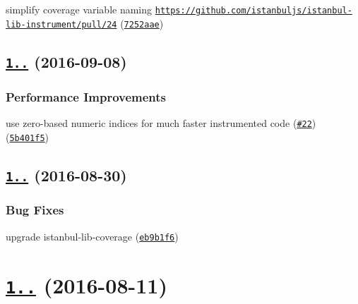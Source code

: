 \begin{DoxyItemize}
\item simplify coverage variable naming \href{https://github.com/istanbuljs/istanbul-lib-instrument/pull/24}{\tt https\+://github.\+com/istanbuljs/istanbul-\/lib-\/instrument/pull/24} (\href{https://github.com/istanbuljs/istanbul-lib-instrument/commit/7252aae}{\tt 7252aae})
\end{DoxyItemize}

\label{_1.1.2}%
 \subsection*{\href{https://github.com/istanbuljs/istanbul-lib-instrument/compare/v1.1.1...v1.1.2}{\tt 1..} (2016-\/09-\/08)}

\subsubsection*{Performance Improvements}


\begin{DoxyItemize}
\item use zero-\/based numeric indices for much faster instrumented code (\href{https://github.com/istanbuljs/istanbul-lib-instrument/issues/22}{\tt \#22}) (\href{https://github.com/istanbuljs/istanbul-lib-instrument/commit/5b401f5}{\tt 5b401f5})
\end{DoxyItemize}

\label{_1.1.1}%
 \subsection*{\href{https://github.com/istanbuljs/istanbul-lib-instrument/compare/v1.1.0...v1.1.1}{\tt 1..} (2016-\/08-\/30)}

\subsubsection*{Bug Fixes}


\begin{DoxyItemize}
\item upgrade istanbul-\/lib-\/coverage (\href{https://github.com/istanbuljs/istanbul-lib-instrument/commit/eb9b1f6}{\tt eb9b1f6})
\end{DoxyItemize}

\label{_1.1.0}%
 \section*{\href{https://github.com/istanbuljs/istanbul-lib-instrument/compare/v1.1.0-alpha.4...v1.1.0}{\tt 1..} (2016-\/08-\/11)}

